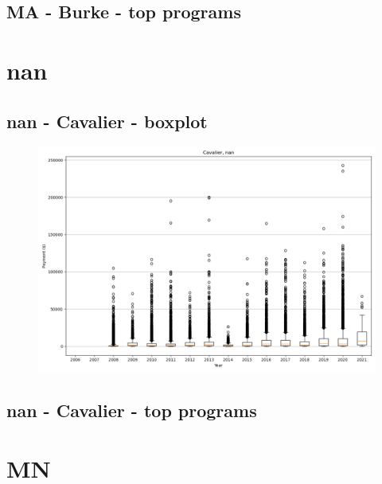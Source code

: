 \subsection*{MA - Burke - top programs}

\newpage
\section*{nan}
\subsection*{nan - Cavalier - boxplot}
\begin{figure}[h]
\centering
\includegraphics[width=7in]{../output/boxplots/counties/Cavalier-nan_boxplot.png}
\end{figure}


\subsection*{nan - Cavalier - top programs}

\newpage
\section*{MN}
